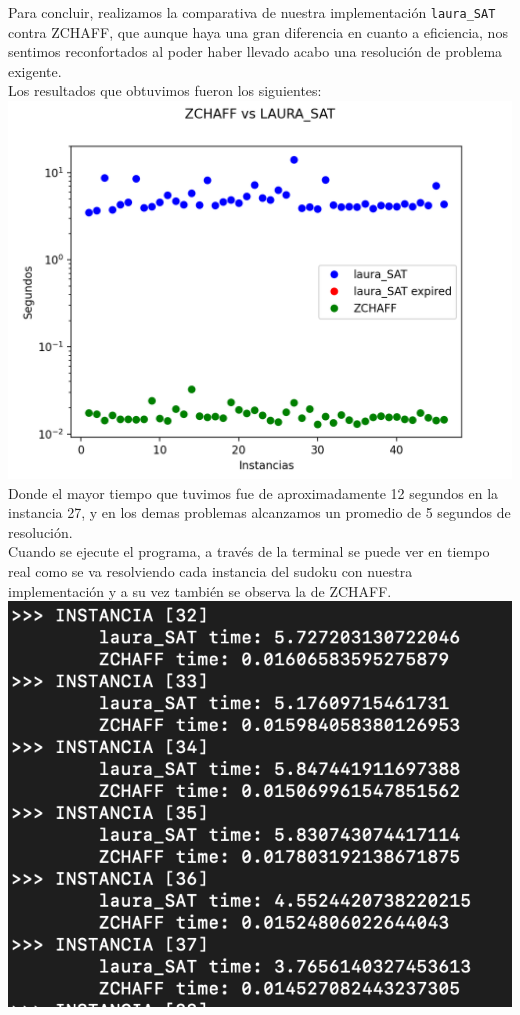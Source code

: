 \documentclass[letterpaper,12pt]{article}
\begin{document}
Para concluir, realizamos la comparativa de nuestra implementación \texttt{laura\_SAT} contra ZCHAFF, que aunque haya una gran diferencia en cuanto a eficiencia, nos sentimos reconfortados al poder haber llevado acabo una resolución de problema exigente.\\

Los resultados que obtuvimos fueron los siguientes:\\

\includegraphics[scale=0.6]{Figure_1.png}\\

Donde el mayor tiempo que tuvimos fue de aproximadamente 12 segundos en la instancia 27, y en los demas problemas alcanzamos un promedio de 5 segundos de resolución. \\

Cuando se ejecute el programa, a través de la terminal se puede ver en tiempo real como se va resolviendo cada instancia del sudoku con nuestra implementación y a su vez también se observa la de ZCHAFF.\\

\includegraphics[scale=0.6]{Shell_Report.png}\\
\end{document}
